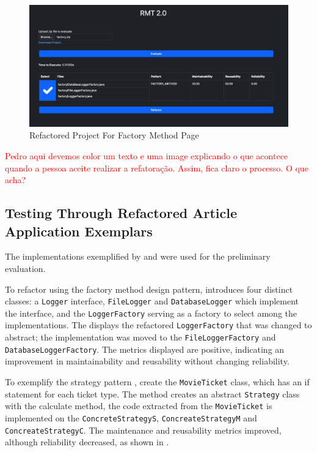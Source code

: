 \begin{figure}[ht!]
\SetCaptionWidth{\textwidth}
\caption{Refactored Project For Factory Method Page}
\label{fig-factory-client}
\includegraphics[width =\textwidth]{Chapter-5/Figures/rmt-factory-refactored.png}
\end{figure}
\FloatBarrier


\textcolor{red}{Pedro aqui devemos color um texto e uma image explicando o que acontece quando a pessoa aceite realizar a refatoração. Assim, fica claro o processo. O que acha?}


\subsection{Testing Through Refactored Article Application Exemplars}
\label{sub-testing-article}

The implementations exemplified by \textcite{liu2014automated} and \textcite{zafeiris2017automated} were used for the preliminary evaluation.

To refactor using the factory method design pattern, \textcite{liu2014automated} introduces four distinct classes: a \texttt{Logger} interface, 	\texttt{FileLogger} and \texttt{DatabaseLogger} which implement the interface, and the \texttt{LoggerFactory} serving as a factory to select among the implementations. The  displays the refactored \texttt{LoggerFactory} that was changed to abstract; the implementation was moved to the \texttt{FileLoggerFactory} and \texttt{DatabaseLoggerFactory}. The metrics displayed are positive, indicating an improvement in maintainability and reusability without changing reliability.

To exemplify the strategy pattern \textcite{liu2014automated}, create the \texttt{MovieTicket} class, which has an if statement for each ticket type. The method creates an abstract \texttt{Strategy} class with the calculate method, the code extracted from the \texttt{MovieTicket} is implemented on the \texttt{ConcreteStrategyS}, \texttt{ConcreateStrategyM} and \texttt{ConcreateStrategyC}. The maintenance and reusability metrics improved, although reliability decreased, as shown in .

